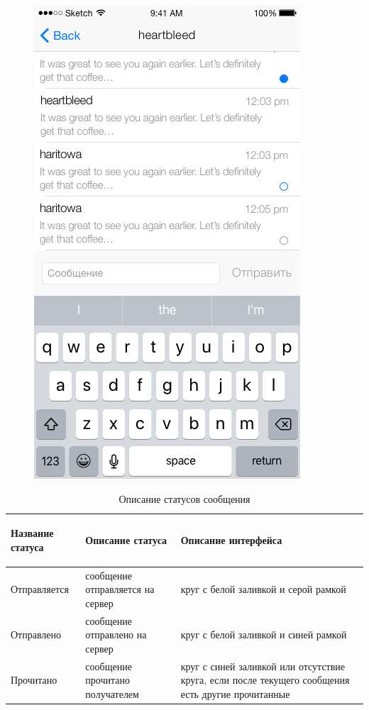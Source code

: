 \begin{figure}[H]
\begin{minipage}{.5\textwidth}
  \includegraphics[height=0.25\textheight]{inc/img/ui/single_dialogue.png}
  \label{sec:usage:dialogues:single}
\end{minipage}
\end{figure}

\begin{table}[!ht]
  \caption{Описание статусов сообщения}
  \label{table:usage:dialogues:statusdesc}
  \centering
  \begin{tabularx}{\linewidth}{
    |>{\hsize=0.75\hsize}X|
    |>{\hsize=1\hsize}X|
    >{\centering\arraybackslash\hsize=1.25\hsize}X|
  }
	\hline
	\begin{center}Название статуса\end{center} & Описание статуса & Описание интерфейса \\

	\hline
	Отправляется & сообщение отправляется на сервер & круг с белой заливкой и серой рамкой \\

	\hline
	Отправлено & сообщение отправлено на сервер & круг с белой заливкой и синей рамкой \\

	\hline
	Прочитано & сообщение прочитано получателем & круг с синей заливкой или отсутствие круга, если после текущего сообщения есть другие прочитанные \\

	\hline
  \end{tabularx}
\end{table}